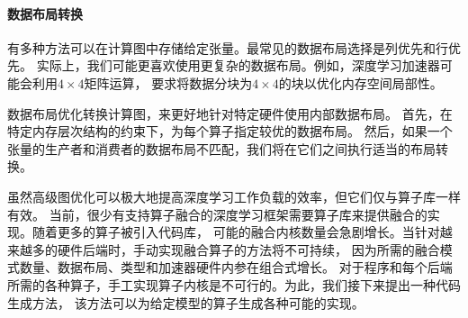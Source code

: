 \paragraph{数据布局转换}
有多种方法可以在计算图中存储给定张量。最常见的数据布局选择是列优先和行优先。
实际上，我们可能更喜欢使用更复杂的数据布局。例如，深度学习加速器可能会利用$4\times 4$矩阵运算，
要求将数据分块为$4\times 4$的块以优化内存空间局部性。

数据布局优化转换计算图，来更好地针对特定硬件使用内部数据布局。
首先，在特定内存层次结构的约束下，为每个算子指定较优的数据布局。
然后，如果一个张量的生产者和消费者的数据布局不匹配，我们将在它们之间执行适当的布局转换。

虽然高级图优化可以极大地提高深度学习工作负载的效率，但它们仅与算子库一样有效。
当前，很少有支持算子融合的深度学习框架需要算子库来提供融合的实现。随着更多的算子被引入代码库，
可能的融合内核数量会急剧增长。当针对越来越多的硬件后端时，手动实现融合算子的方法将不可持续，
因为所需的融合模式数量、数据布局、类型和加速器硬件内参在组合式增长。
对于程序和每个后端所需的各种算子，手工实现算子内核是不可行的。为此，我们接下来提出一种代码生成方法，
该方法可以为给定模型的算子生成各种可能的实现。
